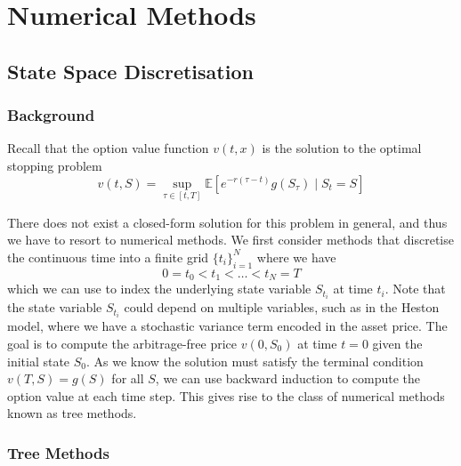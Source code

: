 \chapter{Numerical Methods}

\section{State Space Discretisation}

\subsection{Background}

Recall that the option value function $v(t, x)$ is the solution to the optimal stopping problem
\begin{equation}
    v(t, S) = \sup_{\tau \in [t, T]} \mathbb E\left[ e^{-r(\tau - t)} g(S_\tau) \mid S_t = S \right]
\end{equation}

There does not exist a closed-form solution for this problem in general, and thus we have to resort to numerical methods. We first consider methods that discretise the continuous time into a finite grid $\{t_i\}_{i=1}^N$ where we have
\begin{equation}
    0 = t_0 < t_1 < \dots < t_N = T
\end{equation}
which we can use to index the underlying state variable $S_{t_i}$ at time $t_i$. Note that the state variable $S_{t_i}$ could depend on multiple variables, such as in the Heston model, where we have a stochastic variance term encoded in the asset price. The goal is to compute the arbitrage-free price $v(0, S_0)$ at time $t=0$ given the initial state $S_0$. As we know the solution must satisfy the terminal condition $v(T, S) = g(S)$ for all $S$, we can use backward induction to compute the option value at each time step. This gives rise to the class of numerical methods known as tree methods.

\subsection{Tree Methods}

